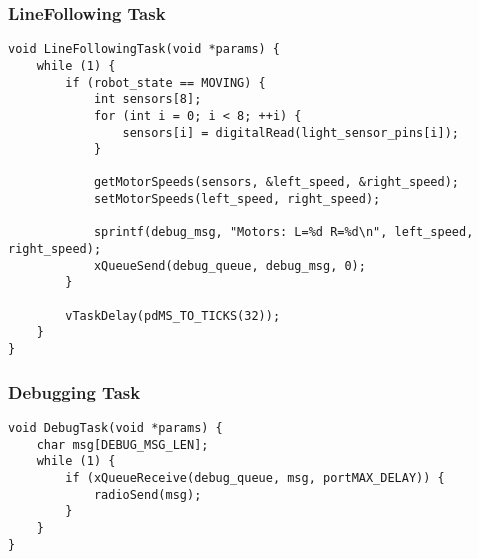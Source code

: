 \subsubsection*{LineFollowing Task}
\begin{verbatim}
void LineFollowingTask(void *params) {
    while (1) {
        if (robot_state == MOVING) {
            int sensors[8];
            for (int i = 0; i < 8; ++i) {
                sensors[i] = digitalRead(light_sensor_pins[i]);
            }

            getMotorSpeeds(sensors, &left_speed, &right_speed);
            setMotorSpeeds(left_speed, right_speed);

            sprintf(debug_msg, "Motors: L=%d R=%d\n", left_speed, right_speed);
            xQueueSend(debug_queue, debug_msg, 0);
        }

        vTaskDelay(pdMS_TO_TICKS(32));
    }
}
\end{verbatim}

\subsubsection*{Debugging Task}
\begin{verbatim}
void DebugTask(void *params) {
    char msg[DEBUG_MSG_LEN];
    while (1) {
        if (xQueueReceive(debug_queue, msg, portMAX_DELAY)) {
            radioSend(msg);
        }
    }
}
\end{verbatim}
